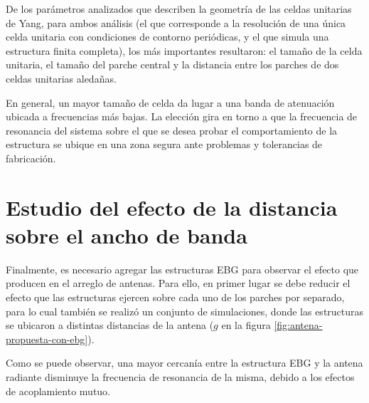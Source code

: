 De los parámetros analizados que describen la geometría de las celdas unitarias de Yang, para ambos análisis (el que corresponde a la resolución de una única celda unitaria con condiciones de contorno periódicas, y el que simula una estructura finita completa), los más importantes resultaron: el tamaño de la celda unitaria, el tamaño del parche central y la distancia entre los parches de dos celdas unitarias aledañas.

En general, un mayor tamaño de celda da lugar a una banda de atenuación ubicada a frecuencias más bajas. La elección gira en torno a que la frecuencia de resonancia del sistema sobre el que se desea probar el comportamiento de la estructura se ubique en una zona segura ante problemas y tolerancias de fabricación.

\section{Estudio del efecto de la distancia sobre el ancho de banda}
\label{sec_efecto_distancia}

Finalmente, es necesario agregar las estructuras EBG para observar el efecto que producen en el arreglo de antenas. Para ello, en primer lugar se debe reducir el efecto que las estructuras ejercen sobre cada uno de los parches por separado, para lo cual también se realizó un conjunto de simulaciones, donde las estructuras se ubicaron a distintas distancias de la antena ($g$ en la figura \ref{fig:antena-propuesta-con-ebg}).

Como se puede observar, una mayor cercanía entre la estructura EBG y la antena radiante disminuye la frecuencia de resonancia de la misma, debido a los efectos de acoplamiento mutuo.

